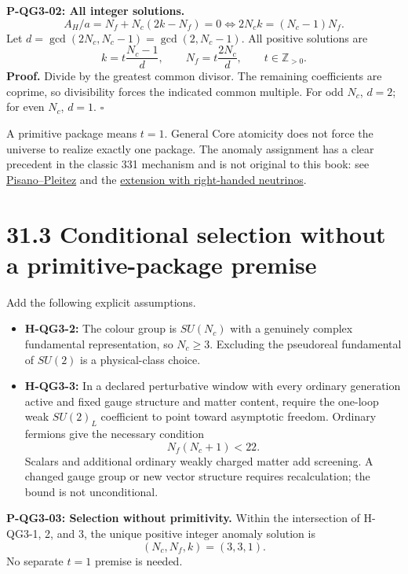 \documentclass[
  11pt,
  oneside]{book}
\providecommand{\tightlist}{%
  \setlength{\itemsep}{0pt}\setlength{\parskip}{0pt}}
\begin{document}
\label{p-qg3-02}{}

\textbf{P-QG3-02: All integer solutions.} \[
A_H/a=N_f+N_c(2k-N_f)=0
\iff 2N_ck=(N_c-1)N_f.
\] Let \(d=\gcd(2N_c,N_c-1)=\gcd(2,N_c-1)\). All positive solutions are
\[
k=t\frac{N_c-1}{d},\qquad N_f=t\frac{2N_c}{d},\qquad
t\in\mathbb Z_{>0}.
\] \textbf{Proof.} Divide by the greatest common divisor. The remaining
coefficients are coprime, so divisibility forces the indicated common
multiple. For odd \(N_c\), \(d=2\); for even \(N_c\), \(d=1\).
\(\square\)

A primitive package means \(t=1\). General Core atomicity does not force
the universe to realize exactly one package. The anomaly assignment has
a clear precedent in the classic 331 mechanism and is not original to
this book: see
\href{https://arxiv.org/abs/hep-ph/9206242}{Pisano--Pleitez} and the
\href{https://link.aps.org/doi/10.1103/PhysRevD.50.R34}{extension with
right-handed neutrinos}.

\section{31.3 Conditional selection without a primitive-package premise}

Add the following explicit assumptions.

\begin{itemize}
\tightlist
\item
  \textbf{H-QG3-2:} The colour group is \(SU(N_c)\) with a genuinely
  complex fundamental representation, so \(N_c\ge3\). Excluding the
  pseudoreal fundamental of \(SU(2)\) is a physical-class choice.
\item
  \textbf{H-QG3-3:} In a declared perturbative window with every
  ordinary generation active and fixed gauge structure and matter
  content, require the one-loop weak \(SU(2)_L\) coefficient to point
  toward asymptotic freedom. Ordinary fermions give the necessary
  condition \[
  N_f(N_c+1)<22.
  \] Scalars and additional ordinary weakly charged matter add
  screening. A changed gauge group or new vector structure requires
  recalculation; the bound is not unconditional.
\end{itemize}

\label{p-qg3-03}{}

\textbf{P-QG3-03: Selection without primitivity.} Within the
intersection of H-QG3-1, 2, and 3, the unique positive integer anomaly
solution is \[
(N_c,N_f,k)=(3,3,1).
\] No separate \(t=1\) premise is needed.
\end{document}
